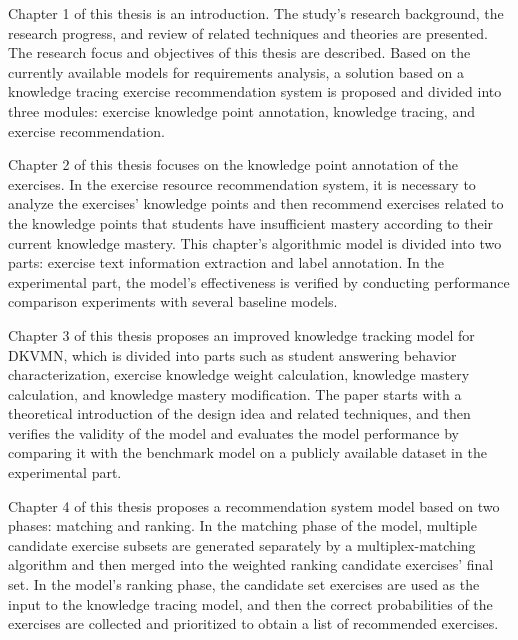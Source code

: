 
Chapter 1 of this thesis is an introduction. The study's research background, the research progress, and review of related techniques and theories are presented. The research focus and objectives of this thesis are described. Based on the currently available models for requirements analysis, a solution based on a knowledge tracing exercise recommendation system is proposed and divided into three modules: exercise knowledge point annotation, knowledge tracing, and exercise recommendation.

Chapter 2 of this thesis focuses on the knowledge point annotation of the exercises. In the exercise resource recommendation system, it is necessary to analyze the exercises' knowledge points and then recommend exercises related to the knowledge points that students have insufficient mastery according to their current knowledge mastery. This chapter's algorithmic model is divided into two parts: exercise text information extraction and label annotation. In the experimental part, the model's effectiveness is verified by conducting performance comparison experiments with several baseline models.

Chapter 3 of this thesis proposes an improved knowledge tracking model for DKVMN, which is divided into parts such as student answering behavior characterization, exercise knowledge weight calculation, knowledge mastery calculation, and knowledge mastery modification. The paper starts with a theoretical introduction of the design idea and related techniques, and then verifies the validity of the model and evaluates the model performance by comparing it with the benchmark model on a publicly available dataset in the experimental part.

Chapter 4 of this thesis proposes a recommendation system model based on two phases: matching and ranking. In the matching phase of the model, multiple candidate exercise subsets are generated separately by a multiplex-matching algorithm and then merged into the weighted ranking candidate exercises' final set. In the model's ranking phase, the candidate set exercises are used as the input to the knowledge tracing model, and then the correct probabilities of the exercises are collected and prioritized to obtain a list of recommended exercises.

